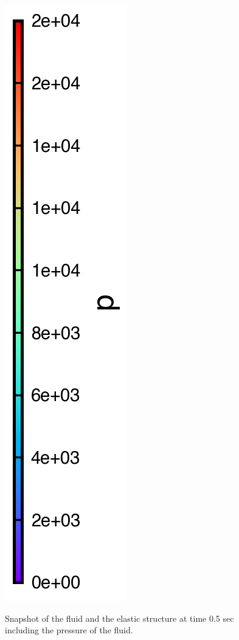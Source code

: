 \documentclass[10pt, conference]{FMFP2022}
\begin{document}
\begin{figure}
{    }
    \qquad
    \subfigure
    {
      \includegraphics[scale=1.0]{figures/ng_2020_hydrostatic_water_column_on_elastic_plate/colorbar_t_0}
    }
    \caption
    { Snapshot of the fluid and the elastic structure at time 0.5 sec
      including the pressure of the fluid.}
    \label{fig:snapshot-hs-fsi}
\end{figure}
\end{document}
